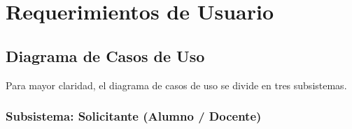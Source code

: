 \chapter{Requerimientos de Usuario}

\section{Diagrama de Casos de Uso}

Para mayor claridad, el diagrama de casos de uso se divide en tres subsistemas.

\subsection{Subsistema: Solicitante (Alumno / Docente)}

